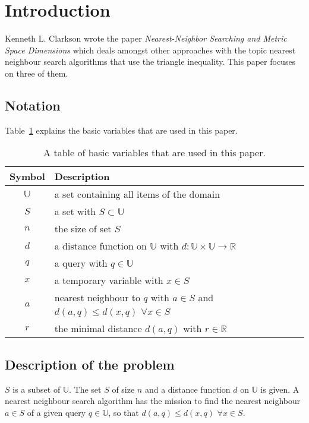 \documentclass[runningheads,a4paper]{llncs}
\begin{document}
\section{Introduction}

Kenneth L. Clarkson wrote the paper \textit{Nearest-Neighbor Searching and Metric Space Dimensions} \cite{Clarkson}
which deals amongst other approaches with the topic nearest neighbour search algorithms that use the triangle
inequality. This paper focuses on three of them.

\subsection{Notation}

Table~\ref{tab:notation} explains the basic variables that are used in this paper.

\begin{table}[H]
	\begin{center}
		\begin{tabularx}{\textwidth}{c X}
			\textbf{Symbol} & \textbf{Description}\\
			\hline
			$\mathbb{U}$ & a set containing all items of the domain\\
			$S$ & a set with $S \subset \mathbb{U}$\\
			$n$ & the size of set $S$\\
			$d$ & a distance function on $\mathbb{U}$ with $d: \mathbb{U} \times \mathbb{U} \to \mathbb{R}$\\
			$q$ & a query with $q \in \mathbb{U}$\\
			$x$ & a temporary variable with $x \in S$\\
			$a$ & nearest neighbour to $q$ with $a \in S$ and $d(a, q) \le d(x, q)$ $\forall x \in S$\\
			$r$ & the minimal distance $d(a, q)$ with $r \in \mathbb{R}$
		\end{tabularx}
	\end{center}
	\caption{A table of basic variables that are used in this paper.}
	\label{tab:notation}
\end{table}

\subsection{Description of the problem}

$S$ is a subset of $\mathbb{U}$. The set $S$ of size $n$ and a distance function $d$ on $\mathbb{U}$ is given. A nearest
neighbour search algorithm has the mission to find the nearest neighbour $a \in S$ of a given query $q \in \mathbb{U}$,
so that $d(a, q) \le d(x, q)$ $\forall x \in S$.
\end{document}
